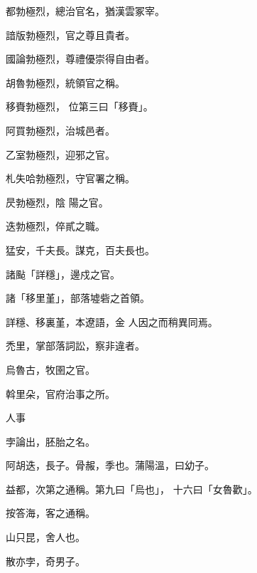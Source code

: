 \begin{pinyinscope}
 都勃極烈，總治官名，猶漢雲冢宰。



 諳版勃極烈，官之尊且貴者。



 國論勃極烈，尊禮優崇得自由者。



 胡魯勃極烈，統領官之稱。



 移賚勃極烈，
 位第三曰「移賚」。



 阿買勃極烈，治城邑者。



 乙室勃極烈，迎邪之官。



 札失哈勃極烈，守官署之稱。



 昃勃極烈，陰
 陽之官。



 迭勃極烈，倅貳之職。



 猛安，千夫長。謀克，百夫長也。



 諸颭「詳穩」，邊戍之官。



 諸「移里堇」，部落墟砦之首領。



 詳穩、移裏堇，本遼語，金
 人因之而稍異同焉。



 禿里，掌部落詞訟，察非違者。



 烏魯古，牧圉之官。



 斡里朵，官府治事之所。



 人事



 孛論出，胚胎之名。



 阿胡迭，長子。骨赧，季也。蒲陽溫，曰幼子。



 益都，次第之通稱。第九曰「烏也」，
 十六曰「女魯歡」。



 按答海，客之通稱。



 山只昆，舍人也。



 散亦孛，奇男子。




\end{pinyinscope}
